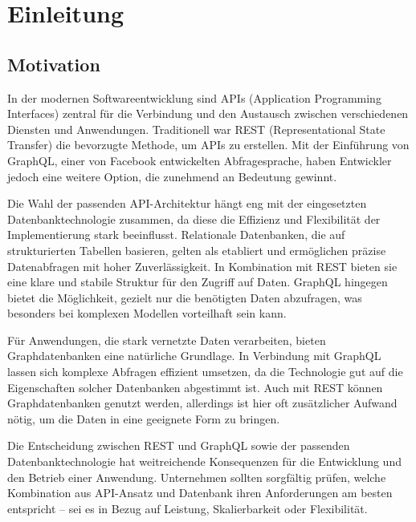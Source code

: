 \chapter{Einleitung} %
\label{sec:einleitung}
\section{Motivation} %
\label{sec:motivation}
In der modernen Softwareentwicklung sind APIs (Application Programming Interfaces) zentral für die Verbindung und den Austausch zwischen verschiedenen Diensten und Anwendungen. Traditionell war REST (Representational State Transfer) die bevorzugte Methode, um APIs zu erstellen. Mit der Einführung von GraphQL, einer von Facebook entwickelten Abfragesprache, haben Entwickler jedoch eine weitere Option, die zunehmend an Bedeutung gewinnt.

\noindent
Die Wahl der passenden API-Architektur hängt eng mit der eingesetzten Datenbanktechnologie zusammen, da diese die Effizienz und Flexibilität der Implementierung stark beeinflusst. Relationale Datenbanken, die auf strukturierten Tabellen basieren, gelten als etabliert und ermöglichen präzise Datenabfragen mit hoher Zuverlässigkeit. In Kombination mit REST bieten sie eine klare und stabile Struktur für den Zugriff auf Daten. GraphQL hingegen bietet die Möglichkeit, gezielt nur die benötigten Daten abzufragen, was besonders bei komplexen Modellen vorteilhaft sein kann.

\noindent
Für Anwendungen, die stark vernetzte Daten verarbeiten, bieten Graphdatenbanken eine natürliche Grundlage. In Verbindung mit GraphQL lassen sich komplexe Abfragen effizient umsetzen, da die Technologie gut auf die Eigenschaften solcher Datenbanken abgestimmt ist. Auch mit REST können Graphdatenbanken genutzt werden, allerdings ist hier oft zusätzlicher Aufwand nötig, um die Daten in eine geeignete Form zu bringen.

\noindent
Die Entscheidung zwischen REST und GraphQL sowie der passenden Datenbanktechnologie hat weitreichende Konsequenzen für die Entwicklung und den Betrieb einer Anwendung. Unternehmen sollten sorgfältig prüfen, welche Kombination aus API-Ansatz und Datenbank ihren Anforderungen am besten entspricht – sei es in Bezug auf Leistung, Skalierbarkeit oder Flexibilität.
\newpage
